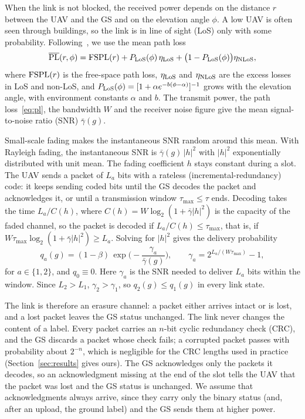 \documentclass[5p,twocolumn]{elsarticle}
\theoremstyle{remark}
\begin{document}
When the link is not blocked, the received power depends on the distance $r$ between the UAV and the GS and on the elevation angle $\phi$. A low UAV is often seen through buildings, so the link is in line of sight (LoS) only with some probability. Following~\cite{alhourani2014lap}, we use the mean path loss
\begin{equation}\label{eq:pl}
\overline{\rm PL}(r,\phi)={\rm FSPL}(r)+P_{\rm LoS}(\phi)\,\eta_{\rm LoS}+\big(1-P_{\rm LoS}(\phi)\big)\eta_{\rm NLoS},
\end{equation}
where ${\rm FSPL}(r)$ is the free-space path loss, $\eta_{\rm LoS}$ and $\eta_{\rm NLoS}$ are the excess losses in LoS and non-LoS, and $P_{\rm LoS}(\phi)=[1+\alpha e^{-b(\phi-\alpha)}]^{-1}$ grows with the elevation angle, with environment constants $\alpha$ and $b$. The transmit power, the path loss~\eqref{eq:pl}, the bandwidth $W$ and the receiver noise figure give the mean signal-to-noise ratio (SNR) $\bar\gamma(g)$.

Small-scale fading makes the instantaneous SNR random around this mean. With Rayleigh fading, the instantaneous SNR is $\bar\gamma(g)\,|h|^2$ with $|h|^2$ exponentially distributed with unit mean. The fading coefficient $h$ stays constant during a slot. The UAV sends a packet of $L_a$ bits with a rateless (incremental-redundancy) code: it keeps sending coded bits until the GS decodes the packet and acknowledges it, or until a transmission window $\tau_{\max}\le\tau$ ends. Decoding takes the time $L_a/C(h)$, where $C(h)=W\log_2(1+\bar\gamma|h|^2)$ is the capacity of the faded channel, so the packet is decoded if $L_a/C(h)\le\tau_{\max}$, that is, if $W\tau_{\max}\log_2(1+\bar\gamma|h|^2)\ge L_a$. Solving for $|h|^2$ gives the delivery probability
\begin{equation}\label{eq:succ}
q_a(g)=(1-\beta)\,\exp\!\Big(-\frac{\gamma_a}{\bar\gamma(g)}\Big),\qquad \gamma_a=2^{L_a/(W\tau_{\max})}-1,
\end{equation}
for $a\in\{1,2\}$,
and $q_0\equiv0$. Here $\gamma_a$ is the SNR needed to deliver $L_a$ bits within the window. Since $L_2>L_1$, $\gamma_2>\gamma_1$, so $q_2(g)\le q_1(g)$ in every link state.

The link is therefore an erasure channel: a packet either arrives intact or is lost, and a lost packet leaves the GS status unchanged. The link never changes the content of a label. Every packet carries an $n$-bit cyclic redundancy check (CRC), and the GS discards a packet whose check fails; a corrupted packet passes with probability about $2^{-n}$, which is negligible for the CRC lengths used in practice (Section~\ref{sec:results} gives ours). The GS acknowledges only the packets it decodes, so an acknowledgment missing at the end of the slot tells the UAV that the packet was lost and the GS status is unchanged. We assume that acknowledgments always arrive, since they carry only the binary status (and, after an upload, the ground label) and the GS sends them at higher power.
\end{document}
